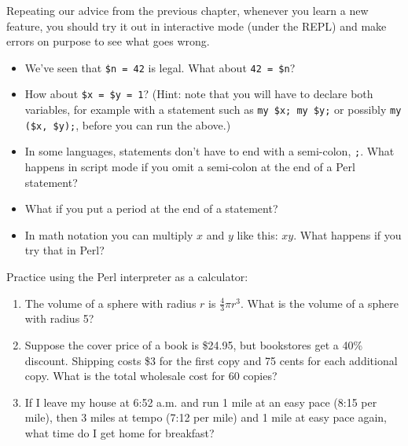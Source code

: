 \begin{exercise}

Repeating our advice from the previous chapter, whenever you learn
a new feature, you should try it out in interactive mode (under 
the REPL) and make errors on purpose to see what goes wrong.

\begin{itemize}

\item We've seen that {\tt \$n = 42} is legal.  What about {\tt 42 = \$n}?

\item How about {\tt \$x = \$y = 1}? (Hint: note that you will 
have to declare both variables, for example with a statement 
such as {\tt my \$x; my \$y;} or possibly {\tt my (\$x, \$y);}, 
before you can run the above.)

\item In some languages, statements don't have to end with a semi-colon, 
{\tt ;}. What happens in script mode if you omit a semi-colon at the end
of a Perl statement?

\item What if you put a period at the end of a statement?

\item In math notation you can multiply $x$ and $y$ like this: $x y$.
What happens if you try that in Perl?

\end{itemize}

\end{exercise}


\begin{exercise}

Practice using the Perl interpreter as a calculator: 

\begin{enumerate}

\item The volume of a sphere with radius $r$ is $\frac{4}{3} \pi r^3$.
  What is the volume of a sphere with radius 5?

\item Suppose the cover price of a book is \$24.95, but bookstores get a
  40\% discount.  Shipping costs \$3 for the first copy and 75 cents
  for each additional copy.  What is the total wholesale cost for
  60 copies?

\item If I leave my house at 6:52 a.m. and run 1 mile at an easy pace
  (8:15 per mile), then 3 miles at tempo (7:12 per mile) and 1 mile at
  easy pace again, what time do I get home for breakfast?

\end{enumerate}
\end{exercise}

